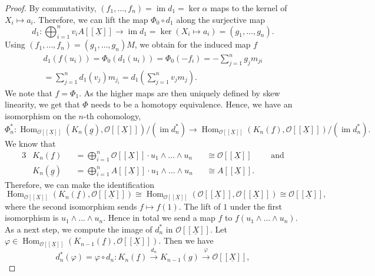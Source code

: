 \documentclass{article}
\theoremstyle{plain}%
\theoremstyle{definition}
\theoremstyle{remark}
\newcommand{\im}{\operatorname{im}}
\renewcommand{\hom}{\operatorname{Hom}}
\begin{document}
\begin{proof}
    By commutativity, \((f_1, \dots, f_n) = \im d_1 = \ker \alpha\) maps to the kernel of \(X_i \mapsto a_i\). Therefore, we can lift the map
    \(\Phi_0 \circ d_1\) along the surjective map 
    \[
        d_1 \colon \bigoplus_{i=1}^n v_i A[[\underline{X}]] \to \im d_1 = \ker(X_i \mapsto a_i) = (g_1, \dots, g_n).
    \]
    Using \((f_1, \dots, f_n) = (g_1, \dots, g_n)M\), we obtain for the induced map \(f\)
    \begin{multline*}
        d_1(f(u_i)) = \Phi_0(d_1(u_i)) = \Phi_0(-f_i) = - \sum_{j=1}^n g_jm_{ji}\\
        = \sum_{j=1}^n d_1(v_j)m_{j_i} = d_1\left(\sum_{j=1}^n v_j m_j\right).
    \end{multline*}
    We note that \(f = \Phi_1\). 
    As the higher maps are then uniquely defined by skew linearity, we get that \(\Phi\) needs to be a homotopy equivalence.
    Hence, we have an isomorphism on the \(n\)-th cohomology,
    \[
        \Phi_n^*\colon \hom_{\mathcal{O}[[\underline{X}]]}(K_n(\underline{g}), \mathcal{O}[[\underline{X}]])/(\im d_n^*)
        \to \hom_{\mathcal{O}[[\underline{X}]]}(K_n(\underline{f}), \mathcal{O}[[\underline{X}]])/(\im d_n^*).
    \]
    We know that 
    \begin{alignat*}{3}
        &K_n(\underline{f}) &&= \bigoplus_{i = 1}^n \mathcal{O}[[\underline{X}]] \cdot u_1\wedge\dots\wedge u_n
        &&\cong \mathcal{O}[[\underline{X}]]\qquad\text{ and}\\
        &K_n(\underline{g}) &&= \bigoplus_{i = 1}^n A[[\underline{X}]] \cdot u_1\wedge\dots\wedge u_n 
        &&\cong A[[\underline{X}]]. 
    \end{alignat*}
    Therefore, we can make the identification
    \[
        \hom_{\mathcal{O}[[\underline{X}]]}(K_n(\underline{f}), \mathcal{O}[[\underline{X}]])
        \cong \hom_{\mathcal{O}[[\underline{X}]]}(\mathcal{O}[[\underline{X}]], \mathcal{O}[[\underline{X}]])
        \cong \mathcal{O}[[\underline{X}]],
    \]
    where the second isomorphism sends \(f \mapsto f(1)\). The lift of \(1\) under the first isomorphism is 
    \(u_1\wedge\dots\wedge u_n\). Hence in total we send a map 
    \(f\) to \(f(u_1\wedge\dots\wedge u_n)\).
    As a next step, we compute the image of \(d_n^*\) in \(\mathcal{O}[[\underline{X}]]\).
    Let \(\varphi \in \hom_{\mathcal{O}[[\underline{X}]]}(K_{n-1}(\underline{f}), \mathcal{O}[[\underline{X}]])\).
    Then we have
    \[
        d_n^*(\varphi) = \varphi \circ d_n \colon K_n(\underline{f}) \xrightarrow{d_n} K_{n-1}(g) \xrightarrow{\varphi} 
        \mathcal{O}[[\underline{X}]],  
\]
\end{proof}
\end{document}
